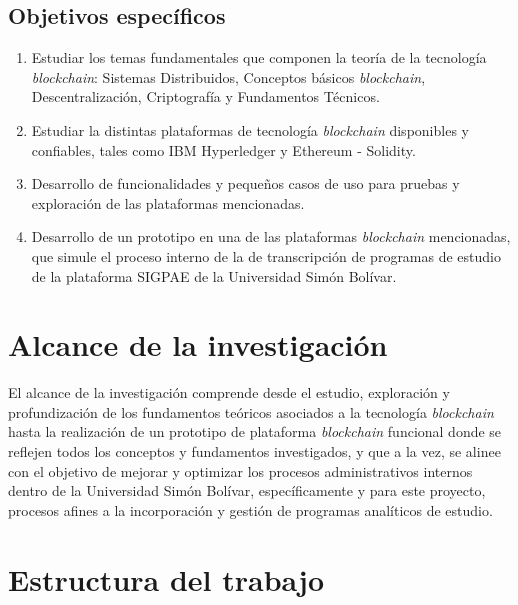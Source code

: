 \subsection{Objetivos específicos}

\begin{enumerate}
  \item Estudiar los temas fundamentales que componen la teoría de la tecnología \textit{blockchain}: 
Sistemas Distribuidos, Conceptos básicos  \textit{blockchain}, Descentralización, Criptografía y Fundamentos Técnicos.

  \item Estudiar la distintas plataformas de tecnología \textit{blockchain} disponibles y confiables, tales como 
	IBM Hyperledger y Ethereum - Solidity.
  \item Desarrollo de funcionalidades y pequeños casos de uso para pruebas y exploración de las plataformas mencionadas.
  \item Desarrollo de un prototipo  en una de las plataformas \textit{blockchain} mencionadas, que simule el proceso interno de la de transcripción de programas de estudio de la plataforma SIGPAE de la Universidad Simón Bolívar.
\end{enumerate}

\section{Alcance de la investigación}


El alcance de la investigación comprende desde  el estudio, exploración y profundización de los fundamentos teóricos asociados a la tecnología \textit{blockchain} hasta la realización de un prototipo de plataforma \textit{blockchain} funcional donde se reflejen todos los conceptos y fundamentos investigados, y que a la vez, se alinee con el objetivo de mejorar y optimizar los procesos administrativos internos dentro de la Universidad Simón Bolívar, específicamente y para este proyecto, procesos afines a la incorporación y gestión de programas analíticos de estudio.


\section{Estructura del trabajo}


